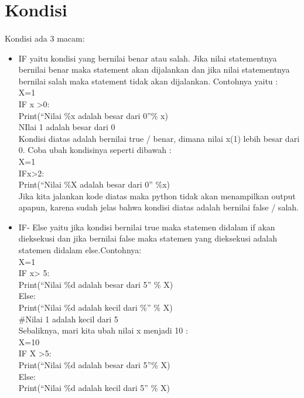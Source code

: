 \documentclass[a4paper,12pt]{report}
\begin{document}
\section*{Kondisi}
\paragraph{}
Kondisi ada 3 macam:
\begin{itemize}
\item IF yaitu kondisi yang bernilai benar atau salah. Jika nilai statementnya bernilai benar maka statement akan dijalankan dan jika nilai statementnya bernilai salah maka statement tidak akan dijalankan. Contohnya yaitu :\\
X=1\\
IF x >0:\\
	Print(“Nilai  \%x adalah besar dari 0”\% x)\\
NIlai 1 adalah besar dari 0\\
Kondisi diatas adalah bernilai true / benar, dimana nilai x(1) lebih besar dari 0. Coba ubah kondisinya seperti dibawah :\\
 X=1\\
IFx>2:\\
Print(“Nilai \%X adalah besar  dari 0” \%x)\\
Jika kita jalankan kode diatas maka python tidak akan menampilkan output apapun, karena sudah jelas bahwa kondisi diatas adalah bernilai false / salah.\\

\item IF- Else yaitu jika kondisi bernilai true maka statemen didalam if akan dieksekusi dan jika bernilai false maka statemen yang dieksekusi adalah statemen didalam else.Contohnya:\\
X=1\\
IF x> 5:\\
Print(“Nilai \%d adalah besar dari 5” \% X)\\
Else:\\
Print(“Nilai \%d adalah kecil dari \%” \% X)\\
\#Nilai 1 adalah kecil dari 5\\
Sebaliknya, mari kita ubah nilai x menjadi 10 :\\
X=10\\
IF X >5:\\
Print(“Nilai \%d adalah besar dari 5”\% X)\\
Else:\\
Print(“Nilai \%d adalah kecil dari 5” \% X)\\


\end{itemize}
\end{document}
